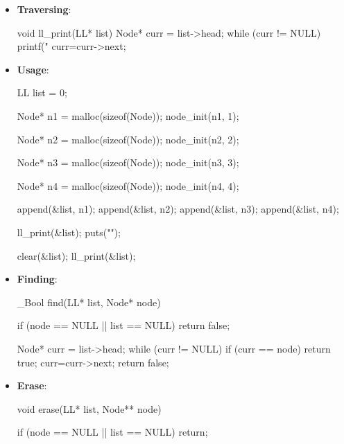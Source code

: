 \documentclass{report}
\begin{document}
\begin{itemize}
\begin{cppcode}
{                    list->head = NULL;
                    list->tail = NULL;
                }
            \end{cppcode}
        \item \textbf{Traversing}:
            \bigbreak \noindent 
            \begin{cppcode}
                void ll_print(LL* list) {
                    Node* curr = list->head;
                    while (curr != NULL) {
                        printf("%
                        curr=curr->next;
                    }
                }
            \end{cppcode}
        \item \textbf{Usage}: 
            \bigbreak \noindent 
            \begin{cppcode}
                LL list = {0};

                Node* n1 = malloc(sizeof(Node));
                node_init(n1, 1);

                Node* n2 = malloc(sizeof(Node));
                node_init(n2, 2);

                Node* n3 = malloc(sizeof(Node));
                node_init(n3, 3);

                Node* n4 = malloc(sizeof(Node));
                node_init(n4, 4);

                append(&list, n1);
                append(&list, n2);
                append(&list, n3);
                append(&list, n4);

                ll_print(&list);
                puts("");

                clear(&list);
                ll_print(&list);
            \end{cppcode}
        \item \textbf{Finding}:
            \bigbreak \noindent 
            \begin{cppcode}
                _Bool find(LL* list, Node* node) {
                    if (node == NULL || list == NULL) return false;

                    Node* curr = list->head;
                    while (curr != NULL) {
                        if (curr == node) return true;
                        curr=curr->next;
                    }
                    return false;
                }
            \end{cppcode}
        \item \textbf{Erase}:
            \bigbreak \noindent 
            \begin{cppcode}
                void erase(LL* list, Node** node) {
                    if (node == NULL || list == NULL) return;

}
\end{cppcode}
\end{itemize}
\end{document}

